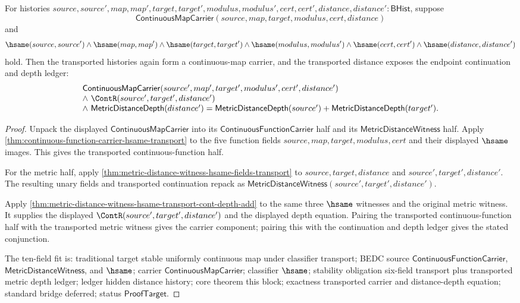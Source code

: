 \begin{theorem}
\label{thm:continuousmap-carrier-hsame-field-transport-depth}
For histories $source,source',map,map',target,target',modulus,modulus',
cert,cert',distance,distance':\mathsf{BHist}$, suppose
$$
\mathsf{ContinuousMapCarrier}(source,map,target,modulus,cert,distance)
$$
and
$$
\hsame(source,source')\land
\hsame(map,map')\land
\hsame(target,target')\land
\hsame(modulus,modulus')\land
\hsame(cert,cert')\land
\hsame(distance,distance')
$$
hold. Then the transported histories again form a continuous-map carrier, and
the transported distance exposes the endpoint continuation and depth ledger:
$$
\begin{array}{l}
\mathsf{ContinuousMapCarrier}(source',map',target',modulus',cert',distance')
\\
\land\ \ContR(source',target',distance')
\\
\land\
\mathsf{MetricDistanceDepth}(distance')=
\mathsf{MetricDistanceDepth}(source')+\mathsf{MetricDistanceDepth}(target').
\end{array}
$$
\end{theorem}
\begin{proof}
Unpack the displayed $\mathsf{ContinuousMapCarrier}$ into its
$\mathsf{ContinuousFunctionCarrier}$ half and its
$\mathsf{MetricDistanceWitness}$ half. Apply
\autoref{thm:continuous-function-carrier-hsame-transport} to the five function
fields $source,map,target,modulus,cert$ and their displayed $\hsame$ images.
This gives the transported continuous-function half.

For the metric half, apply
\autoref{thm:metric-distance-witness-hsame-fields-transport} to
$source,target,distance$ and $source',target',distance'$. The resulting unary
fields and transported continuation repack as
$\mathsf{MetricDistanceWitness}(source',target',distance')$.

Apply
\autoref{thm:metric-distance-witness-hsame-transport-cont-depth-add} to the
same three $\hsame$ witnesses and the original metric witness. It supplies the
displayed $\ContR(source',target',distance')$ and the displayed depth equation.
Pairing the transported continuous-function half with the transported metric
witness gives the carrier component; pairing this with the continuation and
depth ledger gives the stated conjunction.

The ten-field fit is: traditional target stable uniformly continuous map under
classifier transport; BEDC source $\mathsf{ContinuousFunctionCarrier}$,
$\mathsf{MetricDistanceWitness}$, and $\hsame$; carrier
$\mathsf{ContinuousMapCarrier}$; classifier $\hsame$; stability obligation
six-field transport plus transported metric depth ledger; ledger hidden
distance history; core theorem this block; exactness transported carrier and
distance-depth equation; standard bridge deferred; status
$\mathsf{ProofTarget}$.
\end{proof}

